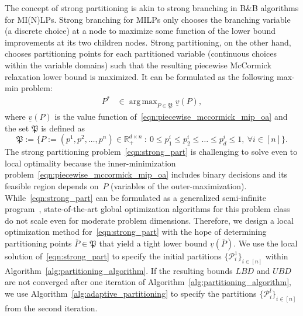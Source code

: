 \documentclass{article}
\newcommand{\pmc}{piecewise McCormick}
\newcommand{\pp}{partitioning points}
\DeclareMathOperator*{\argmax}{arg\,max}
\newcommand{\R}{\mathbb{R}}
\begin{document}
The concept of strong partitioning is akin to strong branching in B\&B algorithms for MI(N)LPs. 
Strong branching for MILPs only chooses the branching variable (a discrete choice) at a node to maximize some function of the lower bound improvements at its two children nodes. 
Strong partitioning, on the other hand, chooses {\pp} for each partitioned variable (continuous choices within the variable domains) such that the resulting {\pmc} relaxation lower bound is maximized.
It can be formulated as the following max-min problem:
\begin{align}
\label{eqn:strong_part}
P^* &\in \argmax_{P \in \mathfrak{P}} \underline{v}(P), \tag{SP}
\end{align}
where $\underline{v}(P)$ is the value function of~\eqref{eqn:piecewise_mccormick_mip_oa} and the set $\mathfrak{P}$ is defined as
\[
\mathfrak{P} := \bigl\{ P := (p^1,p^2,\dots,p^n) \in \R^{d \times n}_+ \: : \: 0 \leq p^i_1 \leq p^i_2 \leq \dots \leq p^i_d \leq 1, \: \forall i \in [n] \bigr\}.
\]
The strong partitioning problem~\eqref{eqn:strong_part} is challenging to solve even to local optimality because the inner-minimization problem~\eqref{eqn:piecewise_mccormick_mip_oa} includes binary decisions and its feasible region depends on~$P$ (variables of the outer-maximization).
While~\eqref{eqn:strong_part} can be formulated as a generalized semi-infinite program~\cite{vazquez2008generalized}, state-of-the-art global optimization algorithms for this problem class do not scale even for moderate problem dimensions.
Therefore, we design a local optimization method for~\eqref{eqn:strong_part} with the hope of determining {\pp} $\bar{P} \in \mathfrak{P}$ that yield a tight lower bound $\underline{v}(\bar{P})$.
We use the local solution of~\eqref{eqn:strong_part} to specify the initial partitions $\{\mathcal{P}^1_i\}_{i \in [n]}$ within Algorithm~\ref{alg:partitioning_algorithm}.
If the resulting bounds $LBD$ and $UBD$ are not converged after one iteration of Algorithm~\ref{alg:partitioning_algorithm}, we use Algorithm~\ref{alg:adaptive_partitioning} to specify the partitions $\{\mathcal{P}^l_i\}_{i \in [n]}$ from the second iteration.
\end{document}
